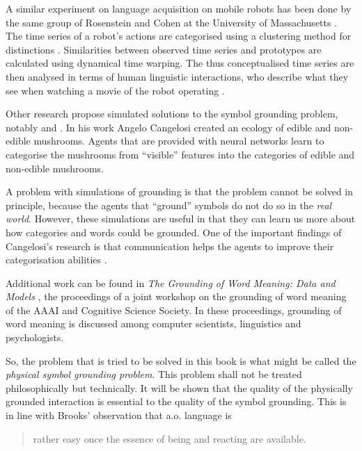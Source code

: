 A similar experiment on language acquisition on mobile robots has been done by the same group of Rosenstein and Cohen at the University of Massachusetts \citep{oatesetal:1999}. The time series of a robot's actions are categorised using a clustering method for distinctions \citep{oates:1999}. Similarities between observed time series and prototypes are calculated using dynamical time warping. The thus conceptualised time series are then analysed in terms of human linguistic interactions, who describe what they see when watching a movie of the robot operating \citep{oatesetal:1999}.


Other research propose simulated solutions to the symbol grounding problem, notably \citet{cangelosiparisi:1998} and \citet{cangelosi:1998}. In his work Angelo Cangelosi created an ecology of edible and non-edible mushrooms. Agents that are provided with neural networks learn to categorise the mushrooms from ``visible'' features into the categories of edible and non-edible mushrooms.

A problem with simulations of grounding is that the problem cannot be solved in principle, because the agents that ``ground'' symbols do not do so in the {\em real world}. However, these simulations are useful in that they can learn us more about how categories and words could be grounded.  One of the important findings of Cangelosi's research is that communication helps the agents to improve their categorisation abilities \citep{cangelosiharnad:2000}.

Additional work can be found in {\em The Grounding of Word Meaning: Data and Models} \citep{gasser:1998}, the proceedings of a joint workshop on the grounding of word meaning of the AAAI and Cognitive Science Society. In these proceedings, grounding of word meaning is discussed among computer scientists, linguistics and psychologists. 


So, the problem that is tried to be solved in this book is what might be called the {\em physical symbol grounding problem}. This problem shall not be treated philosophically but technically. It will be shown that the quality of the physically grounded interaction is essential to the quality of the symbol grounding. This is in line with Brooks' observation that a.o. language is 

\begin{quote}
rather easy once the essence of being and reacting are available. \newline\citep{brooks:1990}
\end{quote}

